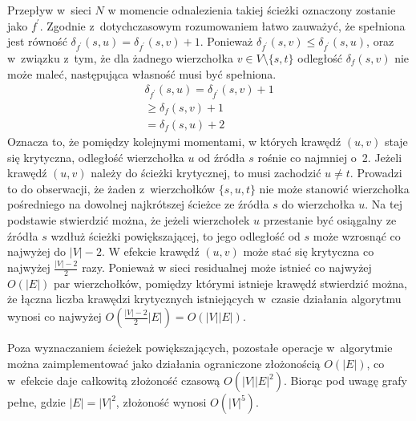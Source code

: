 {\begin{bproof}
    Przepływ w~sieci $N$ w momencie odnalezienia takiej ścieżki oznaczony zostanie jako $f^\prime$.
    Zgodnie z~dotychczasowym rozumowaniem łatwo zauważyć, że spełniona jest równość $\delta_{f^\prime}(s, u)=\delta_{f^\prime}(s, v) + 1$.
    Ponieważ $\delta_{f^\prime}(s, v) \leq \delta_{f^\prime}(s, u)$, oraz w~związku z~tym, że dla żadnego wierzchołka $v \in V\setminus \{s, t\}$ odległość $\delta_f(s, v)$ nie może maleć, następująca własność musi być spełniona. \begin{align*}
        \delta_{f^\prime}(s,u)=\delta_{f^\prime}(s,v)+1\\
                           \geq\delta_f(s, v)+1\\
                              =\delta_f(s, u)+2
    \end{align*}
    Oznacza to, że pomiędzy kolejnymi momentami, w których krawędź $(u, v)$ staje się krytyczna, odległość wierzchołka $u$ od źródła $s$ rośnie co najmniej o~2.
    Jeżeli krawędź $(u, v)$ należy do ścieżki krytycznej, to musi zachodzić $u \neq t$.
    Prowadzi to do obserwacji, że żaden z~wierzchołków $\{s, u, t\}$ nie może stanowić wierzchołka pośredniego na dowolnej najkrótszej ścieżce ze źródła $s$ do wierzchołka $u$.
    Na tej podstawie stwierdzić można, że jeżeli wierzchołek $u$ przestanie być osiągalny ze źródła $s$ wzdłuż ścieżki powiększającej, to jego odległość od $s$ może wzrosnąć co najwyżej do $|V|-2$.
    W efekcie krawędź $(u, v)$ może stać się krytyczna co najwyżej $\frac{|V|-2}{2}$ razy.
    Ponieważ w sieci residualnej może istnieć co najwyżej $O(|E|)$ par wierzchołków, pomiędzy którymi istnieje krawędź stwierdzić można, że łączna liczba krawędzi krytycznych istniejących w~czasie działania algorytmu wynosi co najwyżej $O(\frac{|V|-2}{2}|E|)=O(|V||E|)$.
  \end{bproof}

  Poza wyznaczaniem ścieżek powiększających, pozostałe operacje w~algorytmie można zaimplementować jako działania ograniczone złożonością $O(|E|)$, co w~efekcie daje całkowitą złożoność czasową $O(|V||E|^2)$.
  Biorąc pod uwagę grafy pełne, gdzie $|E| = |V|^2$, złożoność wynosi $O(|V|^5)$.
}